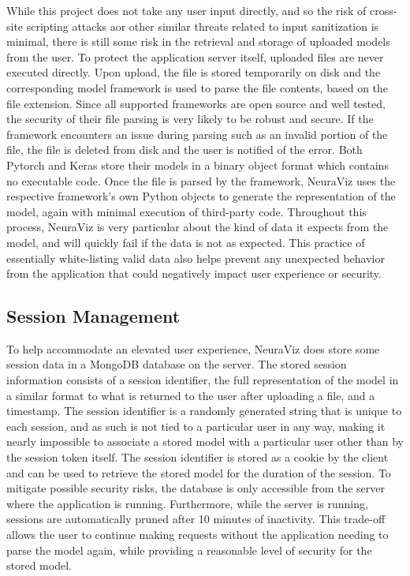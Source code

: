 While this project does not take any user input directly, and so the risk of cross-site scripting attacks aor other similar threats related to input sanitization is minimal, there is still some risk in the retrieval and storage of uploaded models from the user. To protect the application server itself, uploaded files are never executed directly. Upon upload, the file is stored temporarily on disk and the corresponding model framework is used to parse the file contents, based on the file extension. Since all supported frameworks are open source and well tested, the security of their file parsing is very likely to be robust and secure. If the framework encounters an issue during parsing such as an invalid portion of the file, the file is deleted from disk and the user is notified of the error. Both Pytorch and Keras store their models in a binary object format which contains no executable code. Once the file is parsed by the framework, NeuraViz uses the respective framework's own Python objects to generate the representation of the model, again with minimal execution of third-party code. Throughout this process, NeuraViz is very particular about the kind of data it expects from the model, and will quickly fail if the data is not as expected. This practice of essentially white-listing valid data also helps prevent any unexpected behavior from the application that could negatively impact user experience or security.

\subsection{Session Management}
To help accommodate an elevated user experience, NeuraViz does store some session data in a MongoDB database on the server. The stored session information consists of a session identifier, the full representation of the model in a similar format to what is returned to the user after uploading a file, and a timestamp. The session identifier is a randomly generated string that is unique to each session, and as such is not tied to a particular user in any way, making it nearly impossible to associate a stored model with a particular user other than by the session token itself. The session identifier is stored as a cookie by the client and can be used to retrieve the stored model for the duration of the session. To mitigate possible security risks, the database is only accessible from the server where the application is running. Furthermore, while the server is running, sessions are automatically pruned after 10 minutes of inactivity. This trade-off allows the user to continue making requests without the application needing to parse the model again, while providing a reasonable level of security for the stored model.
